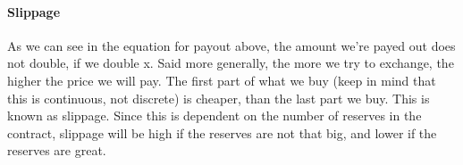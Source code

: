 \paragraph{Slippage}
As we can see in the equation for payout above, the amount we're payed out does
not double, if we double x. Said more generally, the more we try to exchange,
the higher the price we will pay. The first part of what we buy (keep in mind
that this is continuous, not discrete) is cheaper, than the last part we buy.
This is known as slippage. Since this is dependent on the number of reserves in
the contract, slippage will be high if the reserves are not that big, and lower
if the reserves are great.
